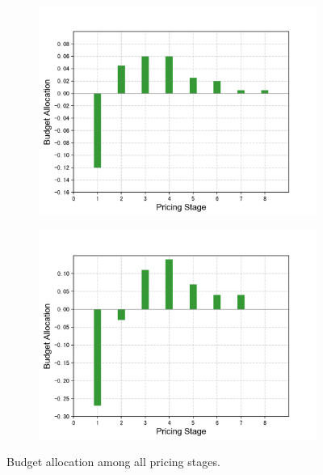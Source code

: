 \documentclass[sigconf,authordraft]{acmart}
\begin{document}
\begin{figure}[tb]
    \begin{subfigure}[b]{0.2\textwidth}
    \includegraphics[width=\textwidth]{m-pricing-c.png}
    \end{subfigure}
    \begin{subfigure}[b]{0.2\textwidth}
    \qquad
    \includegraphics[width=\textwidth]{m-pricing-d.png}
    \end{subfigure}
    \caption{Budget allocation among all pricing stages.}
    \label{fig:m-pricing}
\end{figure}
\end{document}
